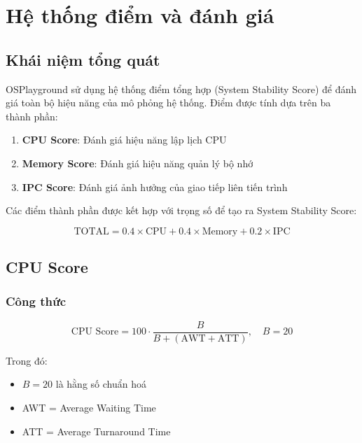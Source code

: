 
\chapter{Hệ thống điểm và đánh giá}
\label{ch:scoring}

\section{Khái niệm tổng quát}

OSPlayground sử dụng hệ thống điểm tổng hợp (System Stability Score) để đánh giá 
toàn bộ hiệu năng của mô phỏng hệ thống. Điểm được tính dựa trên ba thành phần:

\begin{enumerate}[leftmargin=1.5cm]
  \item \textbf{CPU Score}: Đánh giá hiệu năng lập lịch CPU
  \item \textbf{Memory Score}: Đánh giá hiệu năng quản lý bộ nhớ
  \item \textbf{IPC Score}: Đánh giá ảnh hưởng của giao tiếp liên tiến trình
\end{enumerate}

Các điểm thành phần được kết hợp với trọng số để tạo ra System Stability Score:

\begin{equation}
\text{TOTAL} = 0.4 \times \text{CPU} + 0.4 \times \text{Memory} + 0.2 \times \text{IPC}
\end{equation}

\section{CPU Score}

\subsection{Công thức}

\begin{equation}
\text{CPU Score} = 100 \cdot \frac{B}{B + (\text{AWT} + \text{ATT})}, \quad B = 20
\end{equation}

Trong đó:
\begin{itemize}[leftmargin=1.5cm]
  \item $B = 20$ là hằng số chuẩn hoá
  \item AWT = Average Waiting Time
  \item ATT = Average Turnaround Time
\end{itemize}

